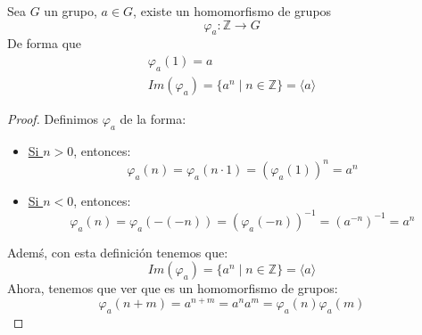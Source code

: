 \begin{prop}
    Sea $G$ un grupo, $a\in G$, existe un homomorfismo de grupos 
    \begin{equation*}
        \varphi_a:\mathbb{Z}\to G
    \end{equation*}
    De forma que
    \begin{gather*}
        \varphi_a(1) = a \\
        Im(\varphi_a) = \{a^n \mid n \in \mathbb{Z}\} = \langle a \rangle 
    \end{gather*}
    \begin{proof}
        Definimos $\varphi_a$ de la forma:
        \begin{itemize}
            \item \underline{Si $n>0$}, entonces:
                \begin{equation*}
                    \varphi_a(n) = \varphi_a(n\cdot 1) = {(\varphi_a(1))}^{n} = a^n
                \end{equation*}
            \item \underline{Si $n<0$}, entonces:
                \begin{equation*}
                    \varphi_a(n) = \varphi_a(-(-n)) = {(\varphi_a(-n))}^{-1} = {(a^{-n})}^{-1} = a^n
                \end{equation*}
        \end{itemize}
        Ademś, con esta definición tenemos que:
        \begin{equation*}
            Im(\varphi_a) = \{a^n \mid n\in \mathbb{Z}\} = \langle a \rangle 
        \end{equation*}
        Ahora, tenemos que ver que es un homomorfismo de grupos:
        \begin{equation*}
            \varphi_a(n+m) = a^{n+m} = a^n a^m = \varphi_a(n)\varphi_a(m)
        \end{equation*}
    \end{proof}
\end{prop}

